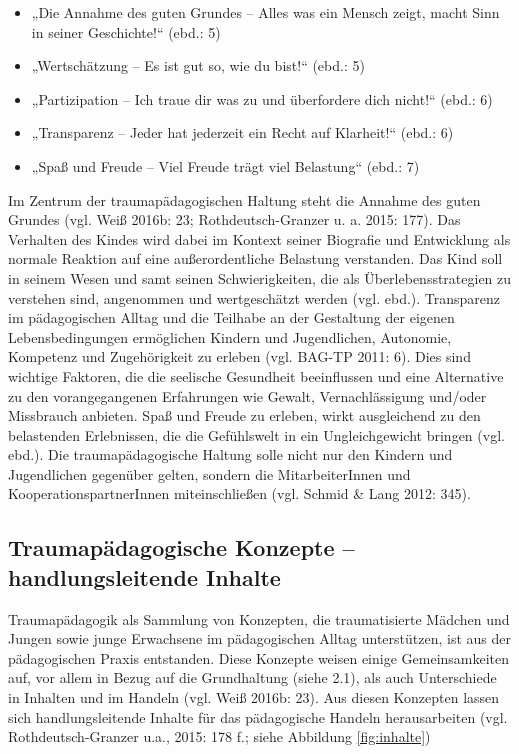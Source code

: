 \begin{itemize}
\item „Die Annahme des guten Grundes – Alles was ein Mensch zeigt, macht Sinn in seiner Geschichte!“ (ebd.: 5) 
\item „Wertsch{\"a}tzung – Es ist gut so, wie du bist!“ (ebd.: 5) 
\item „Partizipation – Ich traue dir was zu und {\"u}berfordere dich nicht!“ (ebd.: 6) 
\item „Transparenz – Jeder hat jederzeit ein Recht auf Klarheit!“ (ebd.: 6) 
\item „Spaß und Freude – Viel Freude tr{\"a}gt viel Belastung“ (ebd.: 7)
\end{itemize}

Im Zentrum der traumapädagogischen Haltung steht die Annahme des guten Grundes (vgl. Weiß 2016b: 23; Rothdeutsch-Granzer u. a. 2015: 177). Das Verhalten des Kindes wird dabei im Kontext seiner Biografie und Entwicklung als normale Reaktion auf eine außerordentliche Belastung verstanden. Das Kind soll in seinem Wesen und samt seinen Schwierigkeiten, die als Überlebensstrategien zu verstehen sind, angenommen und wertgeschätzt werden (vgl. ebd.). Transparenz im pädagogischen Alltag und die Teilhabe an der Gestaltung der eigenen Lebensbedingungen ermöglichen Kindern und Jugendlichen, Autonomie, Kompetenz und Zugeh{\"o}rigkeit zu erleben (vgl. BAG-TP 2011: 6). Dies sind wichtige Faktoren, die die seelische Gesundheit beeinflussen und eine Alternative zu den vorangegangenen Erfahrungen wie Gewalt, Vernachl{\"a}ssigung und/oder Missbrauch anbieten. Spaß und Freude zu erleben, wirkt ausgleichend zu den belastenden Erlebnissen, die die Gefühlswelt in ein Ungleichgewicht bringen (vgl. ebd.). Die traumapädagogische Haltung solle nicht nur den Kindern und Jugendlichen gegenüber gelten, sondern die MitarbeiterInnen und KooperationspartnerInnen miteinschließen (vgl. Schmid \& Lang 2012: 345).

\subsection{Traumapädagogische Konzepte – handlungsleitende Inhalte}
Traumapädagogik als Sammlung von Konzepten, die traumatisierte Mädchen und Jungen sowie junge Erwachsene im pädagogischen Alltag unterstützen, ist aus der pädagogischen Praxis entstanden. Diese Konzepte weisen einige Gemeinsamkeiten auf, vor allem in Bezug auf die Grundhaltung (siehe 2.1), als auch Unterschiede in Inhalten und im Handeln (vgl. Weiß 2016b: 23). Aus diesen Konzepten lassen sich handlungsleitende Inhalte für das pädagogische Handeln herausarbeiten (vgl. Rothdeutsch-Granzer u.a., 2015: 178 f.; siehe Abbildung \ref{fig:inhalte})

